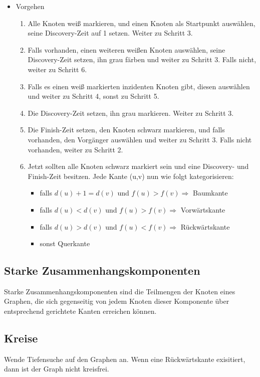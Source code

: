 \documentclass[11pt]{scrartcl}
\begin{document}
\begin{itemize}
\item Vorgehen
\begin{enumerate}
\item Alle Knoten weiß markieren, und einen Knoten als Startpunkt auswählen, seine Discovery-Zeit auf 1 setzen. Weiter zu Schritt 3.
\item Falls vorhanden, einen weiteren weißen Knoten auswählen, seine Discovery-Zeit setzen, ihn grau färben und weiter zu Schritt 3. Falls nicht, weiter zu Schritt 6.
\item Falls es einen weiß markierten inzidenten Knoten gibt, diesen auswählen und weiter zu Schritt 4, sonst zu Schritt 5.
\item Die Discovery-Zeit setzen, ihn grau markieren. Weiter zu Schritt 3.
\item Die Finish-Zeit setzen, den Knoten schwarz markieren, und falls vorhanden, den Vorgänger auswählen und weiter zu Schritt 3. Falls nicht vorhanden, weiter zu Schritt 2.
\item Jetzt sollten alle Knoten schwarz markiert sein und eine Discovery- und Finish-Zeit besitzen. Jede Kante (u,v) nun wie folgt kategorisieren:
\begin{itemize}
\item falls $d(u)+1=d(v)$ und $f(u)>f(v) \Rightarrow$ Baumkante
\item falls $d(u)<d(v)$ und $f(u)>f(v) \Rightarrow$ Vorwärtskante
\item falls $d(u)>d(v)$ und $f(u)<f(v) \Rightarrow$ Rückwärtskante
\item sonst Querkante
\end{itemize}
\end{enumerate}
\end{itemize}

\subsection{Starke Zusammenhangskomponenten}

Starke Zusammenhangskomponenten sind die Teilmengen der Knoten eines Graphen, die sich gegenseitig von jedem Knoten dieser Komponente über entsprechend gerichtete Kanten erreichen können.

\subsection{Kreise}
Wende Tiefensuche auf den Graphen an. Wenn eine Rückwärtskante exisitiert, dann ist der Graph nicht kreisfrei.
\end{document}
